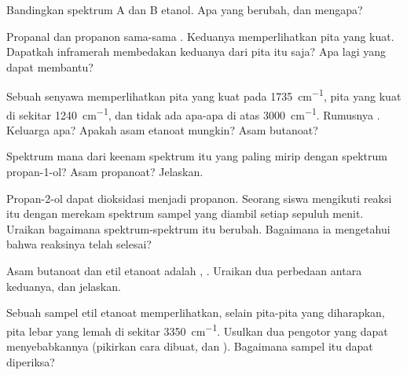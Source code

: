 \begin{exercise}[$\star\star$]\label{exo:g11:infrared:8}
Bandingkan spektrum A dan B etanol. Apa yang berubah, dan mengapa?
\end{exercise}

\begin{exercise}[$\star\star$]\label{exo:g11:infrared:9}
Propanal dan propanon sama-sama . Keduanya memperlihatkan pita
 yang kuat. Dapatkah inframerah membedakan keduanya dari pita
itu saja? Apa lagi yang dapat membantu?
\end{exercise}

\begin{exercise}[$\star\star$]\label{exo:g11:infrared:10}
Sebuah senyawa memperlihatkan pita yang kuat pada \qty{1735}{cm^{-1}},
pita yang kuat di sekitar \qty{1240}{cm^{-1}}, dan tidak ada apa-apa di
atas \qty{3000}{cm^{-1}}. Rumusnya . Keluarga apa? Apakah
asam etanoat mungkin? Asam butanoat?
\end{exercise}

\begin{exercise}[$\star\star$]\label{exo:g11:infrared:11}
Spektrum mana dari keenam spektrum itu yang paling mirip dengan
spektrum  propan-1-ol? Asam propanoat? Jelaskan.
\end{exercise}

\begin{exercise}[$\star\star\star$]\label{exo:g11:infrared:12}
Propan-2-ol dapat dioksidasi menjadi propanon. Seorang siswa mengikuti
reaksi itu dengan merekam spektrum sampel yang diambil setiap sepuluh
menit. Uraikan bagaimana spektrum-spektrum itu berubah. Bagaimana ia
mengetahui bahwa reaksinya telah selesai?
\end{exercise}

\begin{exercise}[$\star\star\star$]\label{exo:g11:infrared:13}
Asam butanoat dan etil etanoat adalah , . Uraikan dua
perbedaan antara  keduanya, dan jelaskan.
\end{exercise}

\begin{exercise}[$\star\star\star$]\label{exo:g11:infrared:14}
Sebuah sampel etil etanoat memperlihatkan, selain pita-pita yang
diharapkan, pita lebar yang lemah di sekitar \qty{3350}{cm^{-1}}.
Usulkan dua pengotor yang dapat menyebabkannya (pikirkan cara 
dibuat, dan ). Bagaimana sampel itu dapat diperiksa?
\end{exercise}

